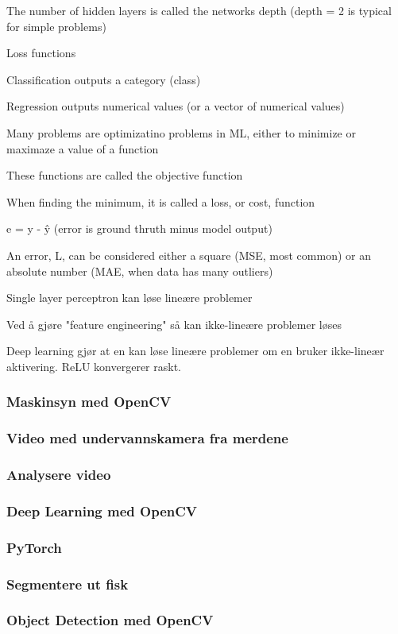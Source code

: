 	The number of hidden layers is called the networks depth (depth = 2 is typical for simple problems)

Loss functions

	Classification outputs a category (class)

	Regression outputs numerical values (or a vector of numerical values)

	Many problems are optimizatino problems in ML, either to minimize or maximaze a value of a function

	These functions are called the objective function

	When finding the minimum, it is called a loss, or cost, function

	e = y - \^y (error is ground thruth minus model output)

	An error, L, can be considered either a square (MSE, most common) or an absolute number (MAE, when data has many outliers)

Single layer perceptron kan løse lineære problemer

Ved å gjøre "feature engineering" så kan ikke-lineære problemer løses

Deep learning gjør at en kan løse lineære problemer om en bruker ikke-lineær aktivering. ReLU konvergerer raskt.

\subsubsection{Maskinsyn med OpenCV}
\subsubsection{Video med undervannskamera fra merdene}
\subsubsection{Analysere video}
\subsubsection{Deep Learning med OpenCV}
\subsubsection{PyTorch}
\subsubsection{Segmentere ut fisk}
\subsubsection{Object Detection med OpenCV}

